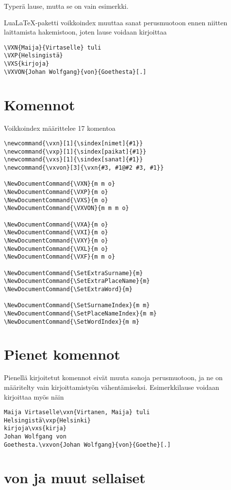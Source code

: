 \documentclass[12pt]{article}
\begin{document}
Typerä lause, mutta se on vain esimerkki.

LuaLaTeX-paketti voikkoindex muuttaa sanat perusmuotoon ennen niitten
laittamista hakemistoon, joten lause voidaan kirjoittaa

\begin{verbatim}
\VXN{Maija}{Virtaselle} tuli
\VXP{Helsingistä}
\VXS{kirjoja}
\VXVON{Johan Wolfgang}{von}{Goethesta}[.]
\end{verbatim}


\section*{Komennot}

Voikkoindex määrittelee 17 komentoa

\begin{verbatim}
\newcommand{\vxn}[1]{\sindex[nimet]{#1}}
\newcommand{\vxp}[1]{\sindex[paikat]{#1}}
\newcommand{\vxs}[1]{\sindex[sanat]{#1}}
\newcommand{\vxvon}[3]{\vxn{#3, #1@#2 #3, #1}}

\NewDocumentCommand{\VXN}{m m o}
\NewDocumentCommand{\VXP}{m o}
\NewDocumentCommand{\VXS}{m o}
\NewDocumentCommand{\VXVON}{m m m o}

\NewDocumentCommand{\VXA}{m o}
\NewDocumentCommand{\VXI}{m o}
\NewDocumentCommand{\VXY}{m o}
\NewDocumentCommand{\VXL}{m o}
\NewDocumentCommand{\VXF}{m m o}

\NewDocumentCommand{\SetExtraSurname}{m}
\NewDocumentCommand{\SetExtraPlaceName}{m}
\NewDocumentCommand{\SetExtraWord}{m}

\NewDocumentCommand{\SetSurnameIndex}{m m}
\NewDocumentCommand{\SetPlaceNameIndex}{m m}
\NewDocumentCommand{\SetWordIndex}{m m}
\end{verbatim}


\section*{Pienet komennot}

Pienellä kirjoitetut komennot eivät muuta sanoja perusmuotoon, ja ne
on määritelty vain kirjoittamistyön vähentämiseksi. Esimerkkilause
voidaan kirjoittaa myös näin

\begin{verbatim}
Maija Virtaselle\vxn{Virtanen, Maija} tuli
Helsingistä\vxp{Helsinki}
kirjoja\vxs{kirja}
Johan Wolfgang von
Goethesta.\vxvon{Johan Wolfgang}{von}{Goethe}[.]
\end{verbatim}


\section*{von ja muut sellaiset}
\end{document}
